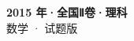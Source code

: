 \documentclass[zihao=-4, a4paper]{ctexart}
\begin{document}
\begin{center}
  {\Large\bfseries 2015 年·全国Ⅱ卷·理科}\\[4pt]
  {\large 数学 · 试题版}
\end{center}
\medskip
{}

\end{document}
